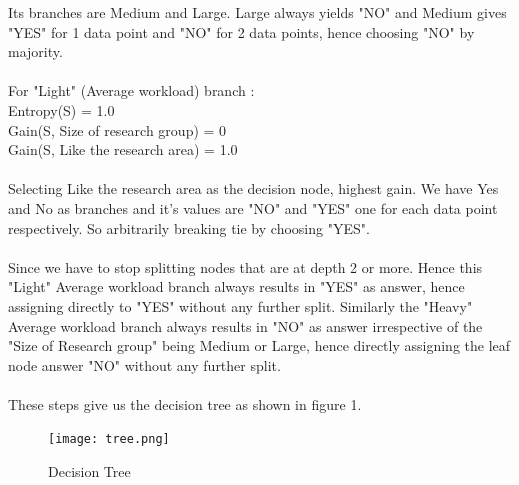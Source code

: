 \documentclass[a4paper,11pt]{article}
\begin{document}
\begin{mlsolution}
Its branches are Medium and Large. Large always yields "NO" and Medium gives "YES" for 1 data point and "NO" for 2 data points, hence choosing "NO" by majority.\\\\For "Light" (Average workload) branch :\\
Entropy(S) = 1.0\\
Gain(S, Size of research group) = 0\\
Gain(S, Like the research area) = 1.0\\\\Selecting Like the research area as the decision node, highest gain. We have Yes and No as branches and it's values are "NO" and "YES" one for each data point respectively. So arbitrarily breaking tie by choosing "YES".\\\\Since we have to stop splitting nodes that are at depth 2 or more. Hence this "Light" Average workload branch always results in "YES" as answer, hence assigning directly to "YES" without any further split. Similarly the "Heavy" Average workload branch always results in "NO" as answer irrespective of the "Size of Research group" being Medium or Large, hence directly assigning the leaf node answer "NO" without any further split.\\\\These steps give us the decision tree as shown in figure 1.

\begin{figure}[th]%
\centering
\texttt{[image: tree.png]}%

\caption{Decision Tree}%
\label{fig:Dtree}%
\end{figure}
\end{mlsolution}
\end{document}
